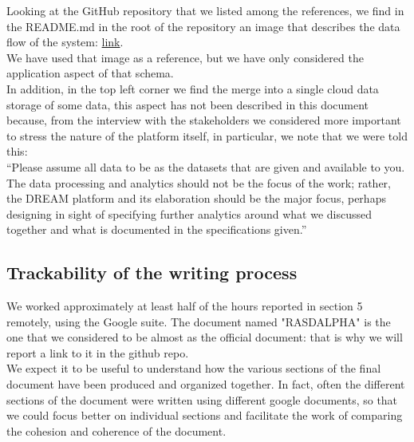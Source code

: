 \documentclass[10pt]{report}
\begin{document}
Looking at the GitHub repository that we listed among the references, we find in the README.md in the root of the repository an image that describes the data flow of the system: \href{https://user-images.githubusercontent.com/42402451/138163914-85322590-f0ea-44f4-88e6-4452f49d7057.png}{link}. \\
We have used that  image as a reference, but we have only considered the application aspect of that schema.\\
In addition, in the top left corner we find the merge into a single cloud data storage of some data, this aspect has not been described in this document because, from the interview with the stakeholders we considered more important to stress the nature of the platform itself, in particular, we note that we were told this: \\
“Please assume all data to be as the datasets that are given and available to you. \\The data
processing and analytics should not be the focus of the work; rather, the DREAM platform and its elaboration should be the major focus, perhaps designing in sight of specifying further analytics around what we discussed together and what is documented in the specifications given.”
\subsection{Trackability of the writing process}
We worked approximately at least half of the hours reported in section 5 remotely, using the Google suite. The document named "RASD\textunderscore ALPHA" is the one that we considered to be almost as the official document: that is why we will report a link to it in the github repo. \\
We expect it to be useful to understand how the various sections of the final document have been produced and organized together. In fact, often the different sections of the document were written using different google documents, so that we could focus better on individual sections and facilitate the work of comparing the cohesion and coherence of the document.
\end{document}
